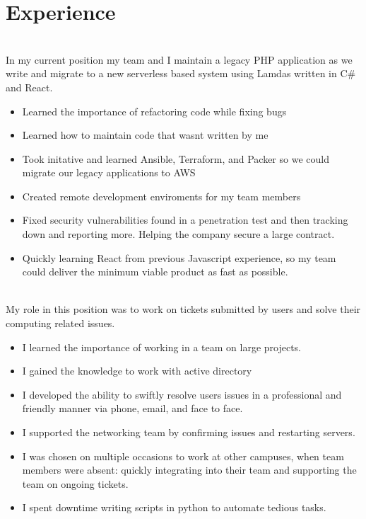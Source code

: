 \documentclass[a4paper]{cv}
\begin{document}
\begin{minipage}[t]{0.55\textwidth}
\section{Experience}
\\
In my current position my team and I maintain a legacy PHP application as we write and migrate to a new serverless based system using Lamdas written in C\# and React.
\begin{itemize}
    \item Learned the importance of refactoring code while fixing bugs
    \item Learned how to maintain code that wasnt written by me
    \item Took initative and learned Ansible, Terraform, and Packer so we could migrate our legacy applications to AWS
    \item Created remote development enviroments for my team members
    \item Fixed security vulnerabilities found in a penetration test and then tracking down and reporting more. Helping the company secure a large contract. 
    \item Quickly learning React from previous Javascript experience, so my team could deliver the minimum viable product as fast as possible.
\end{itemize}
\\
My role in this position was to work on tickets submitted by users and solve their computing related issues.
\begin{itemize}
    \item I learned the importance of working in a team on large projects.
    \item I gained the knowledge to work with active directory
    \item I developed the ability to swiftly resolve users issues in a professional and friendly manner via phone, email, and face to face.
    \item I supported the networking team by confirming issues and restarting servers.
    \item I was chosen on multiple occasions to work at other campuses, when team members were absent: quickly integrating into their team and supporting the team on ongoing tickets.
    \item I spent downtime writing scripts in python to automate tedious tasks.
\end{itemize}
\end{minipage}
\end{document}
